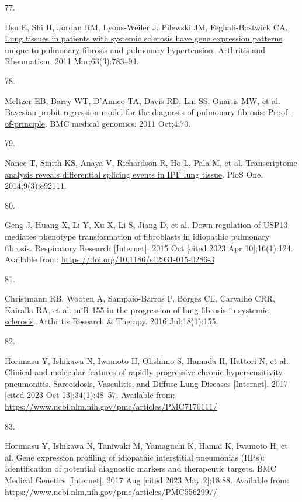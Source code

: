 \documentclass[
]{article}
\newlength{\cslhangindent}
\newlength{\csllabelwidth}
\newenvironment{CSLReferences}[2] %
 {\begin{list}{}{%
  \setlength{\itemindent}{0pt}
  \setlength{\leftmargin}{0pt}
  \setlength{\parsep}{0pt}
  \ifodd #1
   \setlength{\leftmargin}{\cslhangindent}
   \setlength{\itemindent}{-1\cslhangindent}
  \fi
  \setlength{\itemsep}{#2\baselineskip}}}
 {\end{list}}
\newcommand{\CSLLeftMargin}[1]{\parbox[t]{\csllabelwidth}{\strut#1\strut}}
\newcommand{\CSLRightInline}[1]{\parbox[t]{\linewidth - \csllabelwidth}{\strut#1\strut}}
\begin{document}
\begin{CSLReferences}{0}{1}
\CSLLeftMargin{77. }%
\CSLRightInline{Hsu E, Shi H, Jordan RM, Lyons-Weiler J, Pilewski JM, Feghali-Bostwick CA. \href{https://doi.org/10.1002/art.30159}{Lung tissues in patients with systemic sclerosis have gene expression patterns unique to pulmonary fibrosis and pulmonary hypertension}. Arthritis and Rheumatism. 2011 Mar;63(3):783--94. }

\CSLLeftMargin{78. }%
\CSLRightInline{Meltzer EB, Barry WT, D'Amico TA, Davis RD, Lin SS, Onaitis MW, et al. \href{https://doi.org/10.1186/1755-8794-4-70}{Bayesian probit regression model for the diagnosis of pulmonary fibrosis: Proof-of-principle}. BMC medical genomics. 2011 Oct;4:70. }

\CSLLeftMargin{79. }%
\CSLRightInline{Nance T, Smith KS, Anaya V, Richardson R, Ho L, Pala M, et al. \href{https://doi.org/10.1371/journal.pone.0092111}{Transcriptome analysis reveals differential splicing events in {IPF} lung tissue}. PloS One. 2014;9(3):e92111. }

\CSLLeftMargin{80. }%
\CSLRightInline{Geng J, Huang X, Li Y, Xu X, Li S, Jiang D, et al. Down-regulation of {USP13} mediates phenotype transformation of fibroblasts in idiopathic pulmonary fibrosis. Respiratory Research {[}Internet{]}. 2015 Oct {[}cited 2023 Apr 10{]};16(1):124. Available from: \url{https://doi.org/10.1186/s12931-015-0286-3}}

\CSLLeftMargin{81. }%
\CSLRightInline{Christmann RB, Wooten A, Sampaio-Barros P, Borges CL, Carvalho CRR, Kairalla RA, et al. \href{https://doi.org/10.1186/s13075-016-1054-6}{{miR}-155 in the progression of lung fibrosis in systemic sclerosis}. Arthritis Research \& Therapy. 2016 Jul;18(1):155. }

\CSLLeftMargin{82. }%
\CSLRightInline{Horimasu Y, Ishikawa N, Iwamoto H, Ohshimo S, Hamada H, Hattori N, et al. Clinical and molecular features of rapidly progressive chronic hypersensitivity pneumonitis. Sarcoidosis, Vasculitis, and Diffuse Lung Diseases {[}Internet{]}. 2017 {[}cited 2023 Oct 13{]};34(1):48--57. Available from: \url{https://www.ncbi.nlm.nih.gov/pmc/articles/PMC7170111/}}

\CSLLeftMargin{83. }%
\CSLRightInline{Horimasu Y, Ishikawa N, Taniwaki M, Yamaguchi K, Hamai K, Iwamoto H, et al. Gene expression profiling of idiopathic interstitial pneumonias ({IIPs}): Identification of potential diagnostic markers and therapeutic targets. BMC Medical Genetics {[}Internet{]}. 2017 Aug {[}cited 2023 May 2{]};18:88. Available from: \url{https://www.ncbi.nlm.nih.gov/pmc/articles/PMC5562997/}}


\end{CSLReferences}
\end{document}
